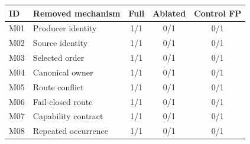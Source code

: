 \begin{tabular}{@{}lp{}ccc@{}}
\toprule
ID & Removed mechanism & Full & Ablated & Control FP \\
\midrule
M01 & Producer identity & 1/1 & 0/1 & 0/1 \\
M02 & Source identity & 1/1 & 0/1 & 0/1 \\
M03 & Selected order & 1/1 & 0/1 & 0/1 \\
M04 & Canonical owner & 1/1 & 0/1 & 0/1 \\
M05 & Route conflict & 1/1 & 0/1 & 0/1 \\
M06 & Fail-closed route & 1/1 & 0/1 & 0/1 \\
M07 & Capability contract & 1/1 & 0/1 & 0/1 \\
M08 & Repeated occurrence & 1/1 & 0/1 & 0/1 \\
\bottomrule
\end{tabular}
